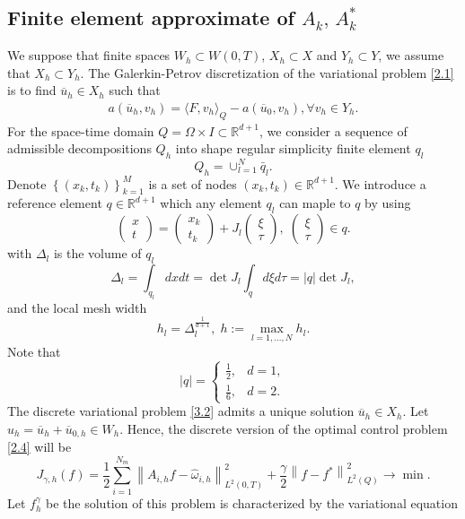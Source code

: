 \documentclass[]{article}
\begin{document}
\subsection{Finite element approximate of $A_k,\, A_k^*$}
We suppose that finite spaces $W_h\subset W(0, T)$, $X_h \subset X$ and $Y_h \subset Y$, we assume that $X_h \subset Y_h$. 
The Galerkin-Petrov discretization of the variational problem \eqref{2.1} is to find $\overline{u}_h\in X_h$ such that
\begin{align}\label{3.2}
	a(\overline{u}_h, v_h)=\langle F, v_h\rangle_Q-a(\overline{u}_0, v_h), \forall v_h\in Y_h.
\end{align}
For the space-time domain $Q=\Omega\times I\subset \mathbb{R}^{d+1}$, we consider a sequence of admissible decompositions $Q_h$ into shape regular simplicity finite element $q_l$
$$Q_h=\cup_{l=1}^{N}\bar{q}_l.$$
Denote $\left\lbrace (x_k, t_k)\right\rbrace_{k=1}^M $ is a set of nodes $(x_k, t_k)\in \mathbb{R}^{d+1}$. We introduce a reference element $q\in \mathbb{R}^{d+1}$ which any element $q_l$ can maple to $q$ by using
$$\begin{pmatrix}x\\t\end{pmatrix}=\begin{pmatrix}x_k\\t_k\end{pmatrix}+J_l\begin{pmatrix}\xi\\\tau\end{pmatrix}, \; \begin{pmatrix}\xi\\\tau\end{pmatrix}\in q.$$
with $\Delta_l$ is the volume of $q_l$ 
$$\Delta_l=\int_{q_l}dxdt=\det J_l\int_q d\xi d\tau=|q|\det J_l,$$
and the local mesh width
$$h_l=\Delta_l^{\frac{1}{d+1}},\; h:=\max_{l=1, ..., N}h_l.$$
Note that
$$|q|=\begin{cases}
	\frac{1}{2},& d=1,\\[0.1cm]
	\frac{1}{6},& d=2.
\end{cases}$$
The discrete variational problem \eqref{3.2} admits a unique solution $\overline{u}_h\in X_h$. Let $u_h=\overline{u}_h+\overline{u}_{0,h}\in W_h$. Hence, the discrete version of the optimal control problem \eqref{2.4} will be
$$J_{\gamma, h}(f)=\frac{1}{2}\sum_{i=1}^{N_m}\left\|A_{i, h}f-\hat{\omega}_{i, h}\right\|^2_{L^2(0, T)}+\frac{\gamma}{2}\left\|f-f^*\right\|^2_{L^2(Q)}\to \min.$$
Let $f^\gamma_h$ be the solution of this problem is characterized by the variational equation
\end{document}
